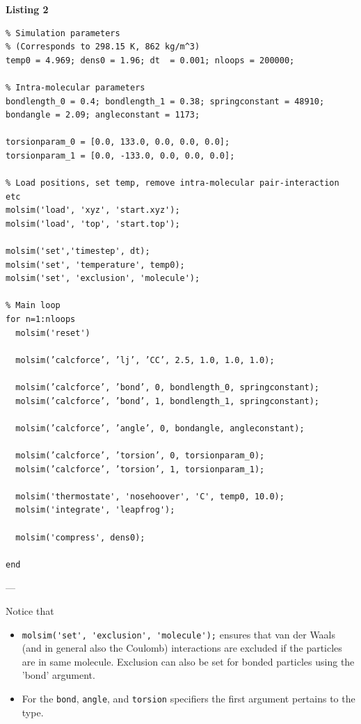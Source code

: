 \documentclass[11pt]{article}
\begin{document}
\noindent \textbf{Listing 2}
\begin{verbatim}
% Simulation parameters 
% (Corresponds to 298.15 K, 862 kg/m^3)
temp0 = 4.969; dens0 = 1.96; dt  = 0.001; nloops = 200000;

% Intra-molecular parameters
bondlength_0 = 0.4; bondlength_1 = 0.38; springconstant = 48910;
bondangle = 2.09; angleconstant = 1173;

torsionparam_0 = [0.0, 133.0, 0.0, 0.0, 0.0]; 
torsionparam_1 = [0.0, -133.0, 0.0, 0.0, 0.0];

% Load positions, set temp, remove intra-molecular pair-interaction etc
molsim('load', 'xyz', 'start.xyz');
molsim('load', 'top', 'start.top');

molsim('set','timestep', dt);
molsim('set', 'temperature', temp0);
molsim('set', 'exclusion', 'molecule');

% Main loop
for n=1:nloops
  molsim('reset')

  molsim(’calcforce’, ’lj’, ’CC’, 2.5, 1.0, 1.0, 1.0);
  
  molsim(’calcforce’, ’bond’, 0, bondlength_0, springconstant);
  molsim(’calcforce’, ’bond’, 1, bondlength_1, springconstant);
  
  molsim(’calcforce’, ’angle’, 0, bondangle, angleconstant);

  molsim(’calcforce’, ’torsion’, 0, torsionparam_0);
  molsim(’calcforce’, ’torsion’, 1, torsionparam_1);
  
  molsim('thermostate', 'nosehoover', 'C', temp0, 10.0);
  molsim('integrate', 'leapfrog');

  molsim('compress', dens0);

end
\end{verbatim}

\noindent ---

\noindent Notice that
\begin{itemize}
\item \verb!molsim('set', 'exclusion', 'molecule');! ensures that van der Waals
  (and in general also the Coulomb) interactions are excluded if the particles
  are in same molecule. Exclusion can also be set for bonded particles using the
  'bond' argument.
\item For the \verb!bond!, \verb!angle!, and \verb!torsion! specifiers the first
  argument pertains to the type.  
\end{itemize}
\end{document}
